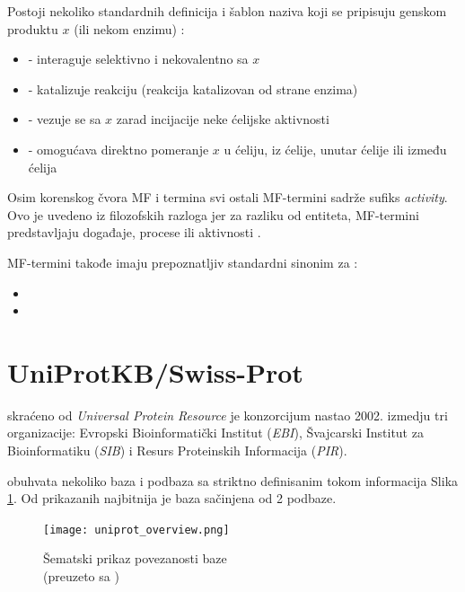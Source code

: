 Postoji nekoliko standardnih definicija i šablon naziva koji se pripisuju genskom
produktu $x$ (ili nekom enzimu) \parencite{go_mf}:
\begin{itemize}
  \item {} - interaguje selektivno i nekovalentno sa $x$
  \item {} - katalizuje reakciju (reakcija katalizovan od strane enzima)
  \item {} - vezuje se sa $x$ zarad incijacije neke ćelijske aktivnosti
  \item {} - omogućava direktno pomeranje $x$ u ćeliju, iz ćelije, unutar ćelije ili između ćelija
\end{itemize}

Osim korenskog čvora MF i  termina svi ostali MF-termini sadrže sufiks \textit{activity}.
Ovo je uvedeno iz filozofskih razloga jer za razliku od entiteta, MF-termini predstavljaju događaje, procese ili aktivnosti \parencite{go_mf}.

MF-termini takođe imaju prepoznatljiv standardni sinonim za  \parencite{go_mf}:
\begin{itemize}
  \item {}
  \item {}
\end{itemize}


\section{UniProtKB/Swiss-Prot}
\label{svis-prot}

\keyword{\uniprot} skraćeno od \textit{Universal Protein Resource} je konzorcijum
nastao 2002. izmedju tri organizacije: Evropski Bioinformatički
Institut (\textit{EBI}), Švajcarski Institut za Bioinformatiku (\textit{SIB}) i Resurs
Proteinskih Informacija (\textit{PIR}).  


\uniprot obuhvata nekoliko baza i podbaza sa striktno definisanim tokom
informacija Slika \ref{fig:uniprot_overview}. Od prikazanih najbitnija je baza
\keyword{\uniprotkb}  sačinjena od 2 podbaze.

\begin{figure}[h!]
  \centering
  \texttt{[image: uniprot\_overview.png]}
  \caption{Šematski prikaz povezanosti \uniprot baze\\ \footnotesize (preuzeto sa \parencite{uniprot_veb})}
  \label{fig:uniprot_overview}
\end{figure}


